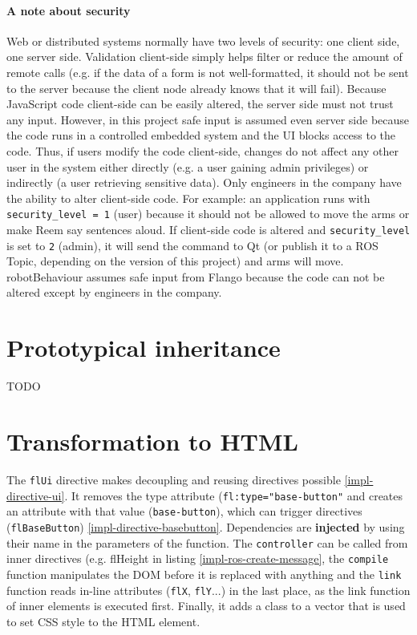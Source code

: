 \paragraph{A note about security} Web or distributed systems normally have two levels of security: one client side, one server side.
Validation client-side simply helps filter or reduce the amount of remote calls (e.g. if the data of a form is not well-formatted, it should not be sent to the server because the client node already knows that it will fail).
Because JavaScript code client-side can be easily altered, the server side must not trust any input.
However, in this project safe input is assumed even server side because the code runs in a controlled embedded system and the \ac{UI} blocks access to the code.
Thus, if users modify the code client-side, changes do not affect any other user in the system either directly (e.g. a user gaining admin privileges) or indirectly (a user retrieving sensitive data).
Only engineers in the company have the ability to alter client-side code.
For example: an application runs with \lstinline$security_level = 1$ (user) because it should not be allowed to move the arms or make Reem say sentences aloud.
If client-side code is altered and \lstinline$security_level$ is set to \lstinline$2$ (admin), it will send the command to Qt (or publish it to a \ac{ROS} Topic, depending on the version of this project) and arms will move.
robotBehaviour assumes safe input from Flango \cm because the code can not be altered except by engineers in the company.


\section{Prototypical inheritance}
TODO


\section{Transformation to \ac{HTML}}
The \texttt{flUi} directive makes decoupling and reusing directives possible \ref{impl-directive-ui}.
It removes the type attribute (\texttt{fl:type="base-button"} and creates an attribute with that value (\texttt{base-button}), which can trigger directives (\texttt{flBaseButton}) \ref{impl-directive-basebutton}.
Dependencies are \textbf{injected} by using their name in the parameters of the function.
The \texttt{controller} can be called from inner directives (e.g. flHeight in listing \ref{impl-ros-create-message}, the \texttt{compile} function manipulates the \ac{DOM} before it is replaced with anything and the \texttt{link} function reads in-line attributes (\texttt{flX}, \texttt{flY}...) in the last place, as the link function of inner elements is executed first.
Finally, it adds a class to a vector that is used to set \ac{CSS} style to the \ac{HTML} element.

